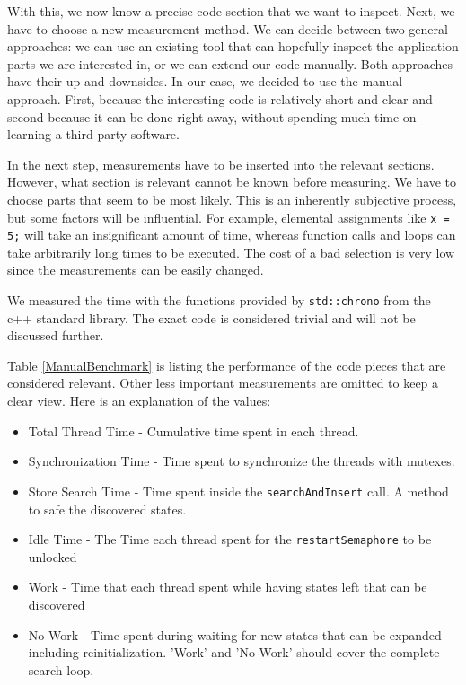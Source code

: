 With this, we now know a precise code section that we want to inspect. Next, we have to choose a new measurement method. We can decide between two general approaches: we can use an existing tool that can hopefully inspect the application parts we are interested in, or we can extend our code manually. Both approaches have their up and downsides. In our case, we decided to use the manual approach. First, because the interesting code is relatively short and clear and second because it can be done right away, without spending much time on learning a third-party software.

In the next step, measurements have to be inserted into the relevant sections. However, what section is relevant cannot be known before measuring. We have to choose parts that seem to be most likely. This is an inherently subjective process, but some factors will be influential. For example, elemental assignments like \texttt{x = 5;} will take an insignificant amount of time, whereas function calls and loops can take arbitrarily long times to be executed. The cost of a bad selection is very low since the measurements can be easily changed.

We measured the time with the functions provided by \texttt{std::chrono} from the c++ standard library. The exact code is considered trivial and will not be discussed further.

Table \ref{ManualBenchmark} is listing the performance of the code pieces that are considered relevant. Other less important measurements are omitted to keep a clear view. Here is an explanation of the values:
\begin{itemize}
    \item Total Thread Time - Cumulative time spent in each thread.
    \item Synchronization Time - Time spent to synchronize the threads with mutexes.
    \item Store Search Time - Time spent inside the \texttt{searchAndInsert} call. A method to safe the discovered states.
    \item Idle Time - The Time each thread spent for the \texttt{restartSemaphore} to be unlocked
    \item Work - Time that each thread spent while having states left that can be discovered
    \item No Work - Time spent during waiting for new states that can be expanded including reinitialization. 'Work' and  'No Work' should cover the complete search loop.
\end{itemize}


